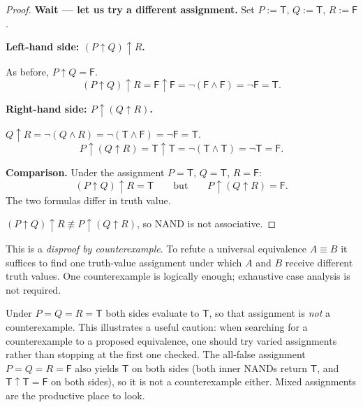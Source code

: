 \begin{proof}
\medskip
\textbf{Wait — let us try a different assignment.} Set $P := \mathsf{T}$, $Q := \mathsf{T}$,
$R := \mathsf{F}$.

\medskip
\textbf{Left-hand side: $(P \uparrow Q) \uparrow R$.}

As before, $P \uparrow Q = \mathsf{F}$.
\[
    (P \uparrow Q) \uparrow R = \mathsf{F} \uparrow \mathsf{F}
    = \neg(\mathsf{F} \wedge \mathsf{F}) = \neg\mathsf{F} = \mathsf{T}.
\]

\medskip
\textbf{Right-hand side: $P \uparrow (Q \uparrow R)$.}

$Q \uparrow R = \neg(Q \wedge R) = \neg(\mathsf{T} \wedge \mathsf{F}) = \neg\mathsf{F} = \mathsf{T}$.
\[
    P \uparrow (Q \uparrow R) = \mathsf{T} \uparrow \mathsf{T}
    = \neg(\mathsf{T} \wedge \mathsf{T}) = \neg\mathsf{T} = \mathsf{F}.
\]

\medskip
\textbf{Comparison.}
Under the assignment $P = \mathsf{T}$, $Q = \mathsf{T}$, $R = \mathsf{F}$:
\[
    (P \uparrow Q) \uparrow R = \mathsf{T}
    \qquad\text{but}\qquad
    P \uparrow (Q \uparrow R) = \mathsf{F}.
\]
The two formulas differ in truth value.

\Hence $(P \uparrow Q) \uparrow R \not\equiv P \uparrow (Q \uparrow R)$,
so NAND is not associative. \AsReq
\end{proof}

\begin{remark*}
This is a \emph{disproof by counterexample}. To refute a universal equivalence
$A \equiv B$ it suffices to find one truth-value assignment under which $A$ and
$B$ receive different truth values. One counterexample is logically enough;
exhaustive case analysis is not required.
\end{remark*}

\begin{remark*}
Under $P = Q = R = \mathsf{T}$ both sides evaluate to $\mathsf{T}$, so that
assignment is \emph{not} a counterexample. This illustrates a useful caution: when
searching for a counterexample to a proposed equivalence, one should try varied
assignments rather than stopping at the first one checked. The all-false assignment
$P = Q = R = \mathsf{F}$ also yields $\mathsf{T}$ on both sides (both inner NANDs
return $\mathsf{T}$, and $\mathsf{T} \uparrow \mathsf{T} = \mathsf{F}$ on both
sides), so it is not a counterexample either. Mixed assignments are the productive
place to look.
\end{remark*}

